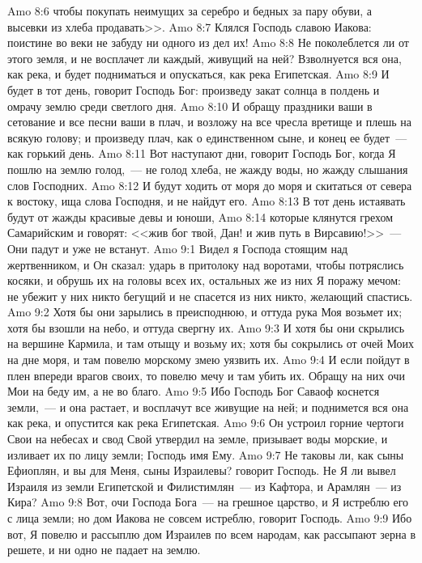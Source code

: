 \vs Amo 8:6 чтобы покупать неимущих за серебро и бедных за пару обуви, а высевки из хлеба продавать>>.
\vs Amo 8:7 Клялся Господь славою Иакова: поистине во веки не забуду ни одного из дел их!
\vs Amo 8:8 Не поколеблется ли от этого земля, и не восплачет ли каждый, живущий на ней? Взволнуется вся она, как река, и будет подниматься и опускаться, как река Египетская.
\vs Amo 8:9 И будет в тот день, говорит Господь Бог: произведу закат солнца в полдень и омрачу землю среди светлого дня.
\vs Amo 8:10 И обращу праздники ваши в сетование и все песни ваши в плач, и возложу на все чресла вретище и плешь на всякую голову; и произведу  плач, как о единственном сыне, и конец ее будет~--- как горький день.
\vs Amo 8:11 Вот наступают дни, говорит Господь Бог, когда Я пошлю на землю голод,~--- не голод хлеба, не жажду воды, но жажду слышания слов Господних.
\vs Amo 8:12 И будут ходить от моря до моря и скитаться от севера к востоку, ища слова Господня, и не найдут его.
\vs Amo 8:13 В тот день истаявать будут от жажды красивые девы и юноши,
\vs Amo 8:14 которые клянутся грехом Самарийским и говорят: <<жив бог твой, Дан! и жив путь в Вирсавию!>>~--- Они падут и уже не встанут.
\vs Amo 9:1 Видел я Господа стоящим над жертвенником, и Он сказал: ударь в притолоку над воротами, чтобы потряслись косяки, и обрушь их на головы всех их, остальных же из них Я поражу мечом: не убежит у них никто бегущий и не спасется из них никто, желающий спастись.
\vs Amo 9:2 Хотя бы они зарылись в преисподнюю, и оттуда рука Моя возьмет их; хотя бы взошли на небо, и оттуда свергну их.
\vs Amo 9:3 И хотя бы они скрылись на вершине Кармила, и там отыщу и возьму их; хотя бы сокрылись от очей Моих на дне моря, и там повелю морскому змею уязвить их.
\vs Amo 9:4 И если пойдут в плен впереди врагов своих, то повелю мечу и там убить их. Обращу на них очи Мои на беду им, а не во благо.
\vs Amo 9:5 Ибо Господь Бог Саваоф коснется земли,~--- и она растает, и восплачут все живущие на ней; и поднимется вся она как река, и опустится как река Египетская.
\vs Amo 9:6 Он устроил горние чертоги Свои на небесах и свод Свой утвердил на земле, призывает воды морские, и изливает их по лицу земли; Господь имя Ему.
\vs Amo 9:7 Не таковы ли, как сыны Ефиоплян, и вы для Меня, сыны Израилевы? говорит Господь. Не Я ли вывел Израиля из земли Египетской и Филистимлян~--- из Кафтора, и Арамлян~--- из Кира?
\vs Amo 9:8 Вот, очи Господа Бога~--- на грешное царство, и Я истреблю его с лица земли; но дом Иакова не совсем истреблю, говорит Господь.
\vs Amo 9:9 Ибо вот, Я повелю и рассыплю дом Израилев по всем народам, как рассыпают зерна в решете, и ни одно не падает на землю.
